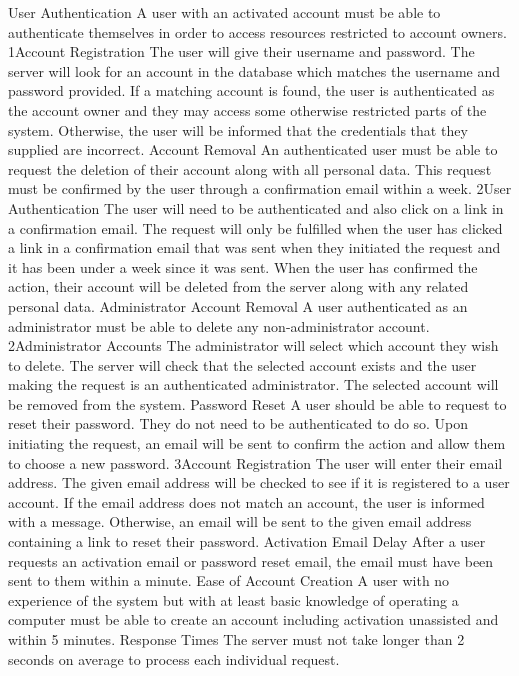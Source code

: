 		\funcreq %
			{User Authentication}
			{A user with an activated account must be able to authenticate 
			themselves in order to access resources restricted to account 
			owners.}
			{1}{Account Registration}
			{The user will give their username and password.}
			{The server will look for an account in the database which matches
			the username and password provided.}
			{If a matching account is found, the user is authenticated as 
			the account owner and they may access some otherwise restricted 
			parts of the system. Otherwise, the user will be informed that the
			credentials that they supplied are incorrect.}
		\funcreq %
			{Account Removal}
			{An authenticated user must be able to request the deletion of 
			their account along with all personal data. This request must be 
			confirmed by the user through a confirmation email within a week.}
			{2}{User Authentication}
			{The user will need to be authenticated and also click on a link 
			in a confirmation email.}
			{The request will only be fulfilled when the user has clicked a 
			link in a confirmation email that was sent when they initiated the 
			request and it has been under a week since it was sent.}
			{When the user has confirmed the action, their account will be 
			deleted from the server along with any related personal data.}
		\funcreq %
			{Administrator Account Removal}
			{A user authenticated as an administrator must be able to delete
			any non-administrator account.}
			{2}{Administrator Accounts}
			{The administrator will select which account they wish to delete.}
			{The server will check that the selected account exists and the
			user making the request is an authenticated administrator.}
			{The selected account will be removed from the system.}
		\funcreq %
			{Password Reset}
			{A user should be able to request to reset their password. They do
			not need to be authenticated to do so. Upon initiating the request,
			an email will be sent to confirm the action and allow them to 
			choose a new password.}
			{3}{Account Registration}
			{The user will enter their email address.}
			{The given email address will be checked to see if it is 
			registered to a user account.}
			{If the email address does not match an account, the user is
			informed with a message. Otherwise, an email will be sent to the
			given email address containing a link to reset their password.}
		\nonfuncreq %
			{Activation Email Delay}
			{After a user requests an activation email or password reset email,
			the email must have been sent to them within a minute.}
		\nonfuncreq %
			{Ease of Account Creation}
			{A user with no experience of the system but with at least basic
			knowledge of operating a computer must be able to create an account
			including activation unassisted and within 5 minutes.}
		\nonfuncreq %
			{Response Times}
			{The server must not take longer than 2 seconds on average to
			process each individual request.}
